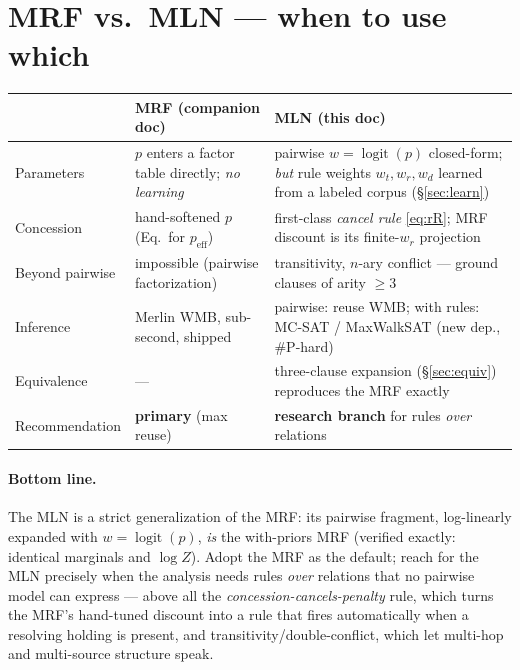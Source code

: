 \documentclass[11pt]{article}
\begin{document}
\section{MRF vs.\ MLN --- when to use which}
\label{sec:vs}

\begin{center}\small
\renewcommand{\arraystretch}{1.15}
\begin{tabular}{@{}p{3.0cm}p{5.3cm}p{5.3cm}@{}}
\toprule
 & \textbf{MRF (companion doc)} & \textbf{MLN (this doc)}\\
\midrule
Parameters      & $p$ enters a factor table directly; \emph{no learning} & pairwise $w=\operatorname{logit}(p)$ closed-form; \emph{but} rule weights $w_t,w_r,w_d$ learned from a labeled corpus (\S\ref{sec:learn})\\
Concession      & hand-softened $p$ (Eq.~for $p_{\text{eff}}$) & first-class \emph{cancel rule} \eqref{eq:rR}; MRF discount is its finite-$w_r$ projection\\
Beyond pairwise & impossible (pairwise factorization) & transitivity, $n$-ary conflict --- ground clauses of arity $\ge3$\\
Inference       & Merlin WMB, sub-second, shipped & pairwise: reuse WMB; with rules: MC-SAT / MaxWalkSAT (new dep., \#P-hard)\\
Equivalence     & --- & three-clause expansion (\S\ref{sec:equiv}) reproduces the MRF exactly\\
Recommendation  & \textbf{primary} (max reuse) & \textbf{research branch} for rules \emph{over} relations\\
\bottomrule
\end{tabular}
\end{center}

\paragraph{Bottom line.} The MLN is a strict generalization of the MRF: its pairwise
fragment, log-linearly expanded with $w=\operatorname{logit}(p)$, \emph{is} the with-priors
MRF (verified exactly: identical marginals and $\log Z$). Adopt the MRF as the default; reach
for the MLN precisely when the analysis needs rules \emph{over} relations that no pairwise
model can express --- above all the \emph{concession-cancels-penalty} rule, which turns the
MRF's hand-tuned discount into a rule that fires automatically when a resolving holding is
present, and transitivity/double-conflict, which let multi-hop and multi-source structure
speak.
\end{document}
